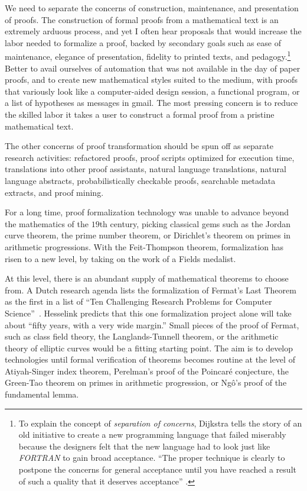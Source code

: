 \documentclass{llncs}
\begin{document}
We need to separate the concerns of construction, maintenance, and
presentation of proofs.  The construction of formal proofs from a
mathematical text is an extremely arduous process, and yet I often
hear proposals that would increase the labor needed to formalize a
proof, backed by secondary goals such as ease of maintenance, elegance
of presentation, fidelity to printed texts, and pedagogy.\footnote{%
  To explain the concept of {\it separation of concerns}, Dijkstra
  tells the story of an old initiative to create a new programming
  language that failed miserably because the designers felt that the
  new language had to look just like {\it FORTRAN} to gain broad
  acceptance. ``The proper technique is clearly to postpone the
  concerns for general acceptance until you have reached a result of
  such a quality that it deserves acceptance''
  \cite{DijkST}.} 
Better to avail ourselves of automation that was not available in the
day of paper proofs, and to create new mathematical styles suited to
the medium, with proofs that variously look like a
computer-aided design session, a functional program, or a list of
hypotheses as messages in gmail.
The most pressing concern is to 
reduce the skilled labor it takes a user to construct a formal proof
from a pristine mathematical text.

The other concerns of proof transformation should be spun off as separate
research activities: refactored proofs,
proof scripts optimized for execution time, translations into other
proof assistants, natural language translations, natural language
abstracts, probabilistically checkable proofs, searchable metadata
extracts, and proof mining.


\bigskip

For a long time, proof formalization technology was unable to advance
beyond the mathematics of the $19$th century, picking classical gems
such as the Jordan curve theorem, the prime number theorem, or
Dirichlet's theorem on primes in arithmetic progressions.  With the
Feit-Thompson theorem, formalization has risen to a new level, by
taking on the work of a Fields medalist.

At this level, there is an abundant supply of mathematical theorems to
choose from.  A Dutch research agenda 
lists the formalization of Fermat's Last Theorem as the first in a
list of ``Ten Challenging Research Problems for Computer
Science''~\cite{Berg}.  Hesselink predicts that this one
formalization project alone will take about ``fifty years, with a very
wide margin.''
Small pieces of the proof of Fermat, such as class field theory, the
Langlands-Tunnell theorem, or the arithmetic theory of elliptic curves
would be a fitting starting point.  The aim is to develop technologies
until formal verification of theorems becomes routine at the level of
Atiyah-Singer index theorem, Perelman's proof of the Poincar\'e
conjecture, the Green-Tao theorem on primes in arithmetic progression,
or Ng\^o's proof of the fundamental lemma.
\end{document}
